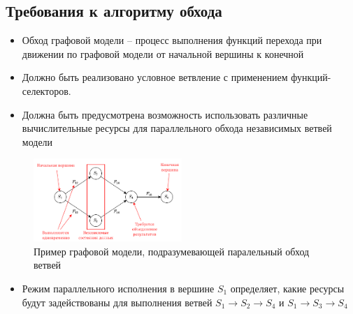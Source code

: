 \subsection{Требования к алгоритму обхода}
\begin{frame}
	\smaller[1]
	\begin{itemize}
		\item Обход графовой модели -- процесс выполнения функций перехода при движении по графовой модели от начальной вершины к конечной
		\item Должно быть реализовано условное ветвление с применением функций-селекторов.
		\item Должна быть предусмотрена возможность использовать различные вычислительные ресурсы для параллельного обхода независимых ветвей модели
	\end{itemize}

	\begin{figure}
		\centering
		\includegraphics[width=0.5\textwidth]{images/illustration.parallel_run.png}
		\caption{Пример графовой модели, подразумевающей паралельный обход ветвей}
	\end{figure}

	\begin{itemize}
		\item Режим параллельного исполнения в вершине $S_1$ определяет, какие ресурсы будут задействованы для выполнения ветвей $S_1 \to S_2 \to S_4$ и $S_1 \to S_3 \to S_4$
	\end{itemize}
\end{frame}

